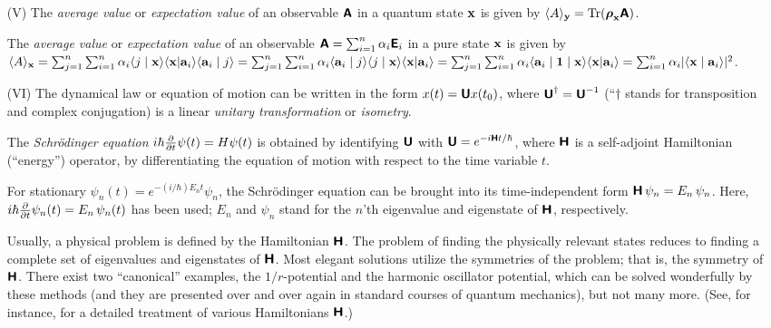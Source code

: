 {\begin{itemize}
\item[(V)]
The {\em average value} or {\em expectation value} of an observable
$\textsf{\textbf{A}}$ in a quantum  state
${\bf x}$
is given by
$\langle A\rangle_{\bf y} =
\textrm{Tr} ({    {\boldsymbol{\rho}}}_{{\bf x}} \textsf{\textbf{A}})$.

The {\em average value} or {\em expectation value} of an observable
$  \textsf{\textbf{A}} =\sum_{i=1}^n \alpha_i    \textsf{\textbf{E}}_i$ in a pure  state
${\bf x}$
is given by
$\langle A\rangle_{\bf x} =
\sum_{j=1}^n \sum_{i=1}^n \alpha_i
\langle j \mid   {{\bf x}}\rangle \langle {{\bf x}} \vert  {\bf a}_i\rangle \langle {\bf a}_i \mid  j  \rangle =
\sum_{j=1}^n \sum_{i=1}^n \alpha_i
 \langle {\bf a}_i \mid  j  \rangle \langle j \mid   {{\bf x}}\rangle \langle {{\bf x}} \vert  {\bf a}_i\rangle =
\sum_{j=1}^n \sum_{i=1}^n \alpha_i
 \langle {\bf a}_i \mid {\bf 1} \mid    {{\bf x}}\rangle \langle {{\bf x}} \vert  {\bf a}_i\rangle =
\sum_{i=1}^n \alpha_i
\vert \langle {\bf x}\mid {\bf a}_i\rangle \vert^2$.

\item[(VI)]
The dynamical law or equation of motion can be written in the form
$x (t) =\textsf{\textbf{U}}x (t_0) $,
where $\textsf{\textbf{U}}^\dagger =\textsf{\textbf{U}}^{-1}$ (``$\dagger $ stands for transposition and
complex conjugation) is a
linear {\em unitary transformation} or {\em isometry}.

The {\em Schr\"odinger equation}
$
i\hbar {\partial \over \partial t}  \psi (t)    =
H \psi (t) $
 is obtained by identifying $\textsf{\textbf{U}}$ with
$\textsf{\textbf{U}}=e^{-i\textsf{\textbf{H}}t/\hbar }$,
where $\textsf{\textbf{H}}$ is a self-adjoint  Hamiltonian (``energy'') operator,
by differentiating the equation of motion
with respect to the time variable $t$.

For stationary $ \psi_n
(t)=
e^{-(i/\hbar )E_nt}  \psi_n $, the Schr\"odinger equation
can be brought into its time-independent form
$\textsf{\textbf{H}}\, \psi_n
=
E_n\, \psi_n $.
Here,
$i\hbar {\partial \over \partial t} \psi_n (t)
=
E_n \, \psi_n (t) $  has been used;
$E_n$
and $\psi_n $
stand for the $n$'th eigenvalue and eigenstate of
$\textsf{\textbf{H}}$, respectively.

Usually, a physical problem is defined by the Hamiltonian ${\textsf{\textbf{H}}}$.
The problem of finding the physically relevant states reduces to finding
a complete set of eigenvalues and eigenstates of ${\textsf{\textbf{H}}}$.
Most elegant solutions utilize the symmetries of the problem; that is, the symmetry of
${\textsf{\textbf{H}}}$. There exist two ``canonical'' examples, the $1/r$-potential
and
the harmonic oscillator potential, which can be solved wonderfully by
these methods (and they are presented over and over again in standard
courses of quantum mechanics), but not many more. (See, for instance,
\cite{davydov} for a detailed treatment of various Hamiltonians ${\textsf{\textbf{H}}}$.)
\end{itemize}





}
